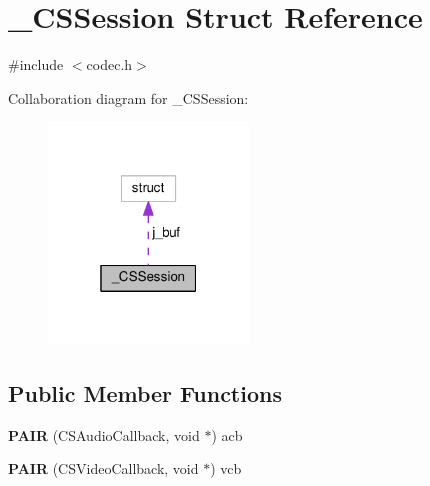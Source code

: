 \hypertarget{struct___c_s_session}{\section{\+\_\+\+C\+S\+Session Struct Reference}
\label{struct___c_s_session}
}


{\ttfamily \#include $<$codec.\+h$>$}



Collaboration diagram for \+\_\+\+C\+S\+Session\+:
\nopagebreak
\begin{figure}[H]
\begin{center}
\leavevmode
\includegraphics[width=151pt]{struct___c_s_session__coll__graph}
\end{center}
\end{figure}
\subsection*{Public Member Functions}
\begin{DoxyCompactItemize}
\item 
\hypertarget{struct___c_s_session_a386fcae0e3f3ef0fcd8b2c401a7a25e5}{{\bfseries P\+A\+I\+R} (C\+S\+Audio\+Callback, void $\ast$) acb}\label{struct___c_s_session_a386fcae0e3f3ef0fcd8b2c401a7a25e5}

\item 
\hypertarget{struct___c_s_session_a68cfb40772f235c4c4649ca156cea307}{{\bfseries P\+A\+I\+R} (C\+S\+Video\+Callback, void $\ast$) vcb}\label{struct___c_s_session_a68cfb40772f235c4c4649ca156cea307}

\end{DoxyCompactItemize}
